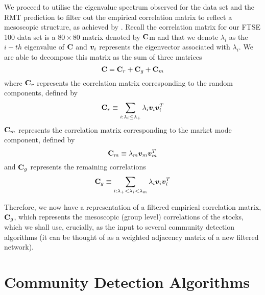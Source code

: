 We proceed to utilise the eigenvalue spectrum observed for the data set and the RMT prediction to filter out the empirical correlation matrix to reflect a mesoscopic structure, as achieved by \cite{MG13}. Recall the correlation matrix for our FTSE 100 data set is a $80 \times 80$ matrix denoted by $\mathbf C$m and that we denote $\lambda_{i}$ as the $i-th$ eigenvalue of $\mathbf C$ and $\vecvar{v_{i}}$ represents the eigenvector associated with $\lambda_{i}$. We are able to decompose this matrix as the sum of three matrices
\begin{equation}
\label{eq:decompositionCorrelationMatrix}
	\mathbf C = \mathbf C_{r} + \mathbf C_{g} + \mathbf C_{m}
\end{equation}
where $\mathbf C_{r}$ represents the correlation matrix corresponding to the random components, defined by
\begin{equation}
\label{eq:randomCorrelationMatrix}
	\matvar{C}_{r} \equiv \sum_{i:\lambda_{i}\leq\lambda_{+}} \lambda_{i} \vecvar{v_{i}} \transpose{\vecvar{v_{i}}}
\end{equation}
$\mathbf C_{m}$ represents the correlation matrix corresponding to the market mode component, defined by
\begin{equation}
\label{eq:marketModeCorrelationMatrix}
	\matvar{C}_{m} \equiv \lambda_{m} \vecvar{v_{m}} \transpose{\vecvar{v_{m}}}
\end{equation}
and $\mathbf C_{g}$ represents the remaining correlations
\begin{equation}
\label{eq:remainingCorrelationMatrix}
	\matvar{C}_{g} \equiv \sum_{i:\lambda_{+} < \lambda_{i} < \lambda_{m}} \lambda_{i} \vecvar{v_{i}} \transpose{\vecvar{v_{i}}}
\end{equation}

Therefore, we now have a representation of a filtered empirical correlation matrix, $\mathbf C_{g}$, which represents the mesoscopic (group level) correlations of the stocks, which we shall use, crucially, as the input to several community detection algorithms (it can be thought of as a weighted adjacency matrix of a new filtered network).


\section{Community Detection Algorithms}
\label{sec:communityDetectionAlgorithms}


